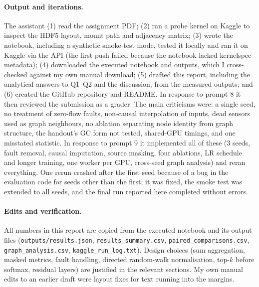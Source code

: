 \documentclass[11pt,a4paper]{article}
\begin{document}
\paragraph{Output and iterations.} The assistant (1) read the assignment PDF; (2) ran a probe kernel on Kaggle to inspect the HDF5
layout, mount path and adjacency matrix; (3) wrote the notebook, including a synthetic smoke-test mode, tested it locally and ran it
on Kaggle via the API (the first push failed because the notebook lacked kernelspec metadata); (4) downloaded the executed notebook
and outputs, which I cross-checked against my own manual download; (5) drafted this report, including the analytical answers to
Q1--Q2 and the discussion, from the measured outputs; and (6) created the GitHub repository and README. In response to prompt 8 it
then reviewed the submission as a grader. The main criticisms were: a single seed, no treatment of zero-flow faults, non-causal
interpolation of inputs, dead sensors used as graph neighbours, no ablation separating node identity from graph structure, the
handout's GC form not tested, shared-GPU timings, and one misstated statistic. In response to prompt 9 it implemented all of these
(3 seeds, fault removal, causal imputation, source masking, four ablations, LR schedule and longer training, one worker per GPU,
cross-seed graph analysis) and reran everything. One rerun crashed after the first seed because of a bug in the evaluation code for
seeds other than the first; it was fixed, the smoke test was extended to all seeds, and the final run reported here completed
without errors.

\paragraph{Edits and verification.} All numbers in this report are copied from the executed notebook and its output files
(\texttt{outputs/results.json}, \texttt{results\_summary.csv}, \texttt{paired\_comparisons.csv}, \texttt{graph\_analysis.csv},
\texttt{kaggle\_run\_log.txt}). Design choices (sum aggregation, masked metrics, fault handling, directed random-walk
normalisation, top-$k$ before softmax, residual layers) are justified in the relevant sections. My own manual edits to an earlier
draft were layout fixes for text running into the margins.
\end{document}
